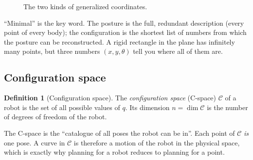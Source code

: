 \documentclass[11pt,a4paper]{article}
\newcommand{\R}{\mathbb{R}}
\newcommand{\C}{\mathcal{C}}
\newcommand{\SO}{\mathrm{SO}}
\theoremstyle{definition}
\newtheorem{definition}{Definition}[section]
\theoremstyle{plain}
\theoremstyle{remark}
\begin{document}
\begin{figure}[ht]
\centering
{}
\caption{The two kinds of generalized coordinates.}
\end{figure}

\begin{intuition}
``Minimal'' is the key word. The posture is the full, redundant description (every point of every body); the configuration is the shortest list of numbers from which the posture can be reconstructed. A rigid rectangle in the plane has infinitely many points, but three numbers $(x,y,\theta)$ tell you where all of them are.
\end{intuition}

\subsection{Configuration space}

\begin{definition}[Configuration space]
The \emph{configuration space} (C-space) $\C$ of a robot is the set of all possible values of $q$. Its dimension $n=\dim\C$ is the number of degrees of freedom of the robot.
\end{definition}

\begin{intuition}
The C-space is the ``catalogue of all poses the robot can be in''. Each point of $\C$ \emph{is} one pose. A curve in $\C$ is therefore a motion of the robot in the physical space, which is exactly why planning for a robot reduces to planning for a point.
\end{intuition}
\end{document}
